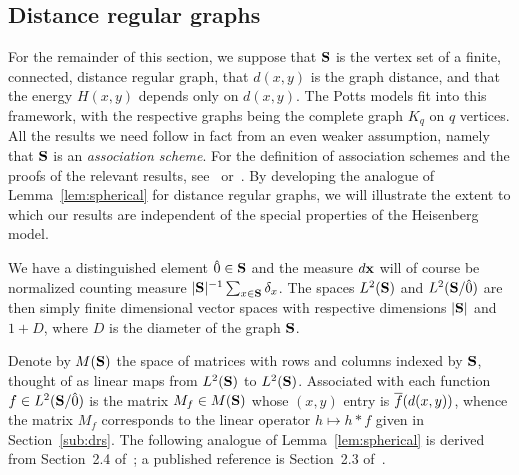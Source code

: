 \subsection{Distance regular graphs} \label{sub:finite}

For the remainder of this section, we suppose that $\S$ is the vertex
set of a finite, connected, distance regular graph, that $d(x,y)$ is 
the graph distance, and that the energy $H (x,y)$ depends only 
on $d(x,y)$.  The Potts models fit into this 
framework, with the respective graphs being 
the complete graph $K_q$ on $q$ vertices.  
All the results we need follow
in fact from an even weaker assumption, namely that $\S$ is an
{\it association scheme}.  For the definition of association schemes
and the proofs of the relevant results, see~\cite{BCN} or~\cite{Ter98}.
By developing 
the analogue of Lemma~\ref{lem:spherical} for distance regular graphs, 
we will illustrate the extent to which our results are independent of
the special properties of the Heisenberg model.

We have a distinguished element $\zero \in \S$ and the measure $\dx$ will of
course be normalized counting measure $|\S|^{-1} \sum_{x \in \S} \delta_x$.
The spaces $\lts$ and $\ltsg$ are then simply finite dimensional vector
spaces with respective dimensions $|\S|$ and $1+D$, where $D$ is the 
diameter of the graph $\S$.  

Denote by $M(\S)$ the space of matrices with rows and columns
indexed by $\S$, thought of as linear maps from $\lts$ to $\lts$.  
Associated with each function $f \in \ltsg$ is the matrix $M_f \in M(\S)$
whose $(x,y)$ entry is $\fb (d(x,y))$, whence the matrix $M_f$ 
corresponds to the linear operator $h \mapsto h * f$ given in 
Section~\ref{sub:drs}. The following
analogue of Lemma~\ref{lem:spherical} is derived from Section~2.4
of~\cite{Ter98}; a published reference is Section~2.3 of~\cite{BCN}.

